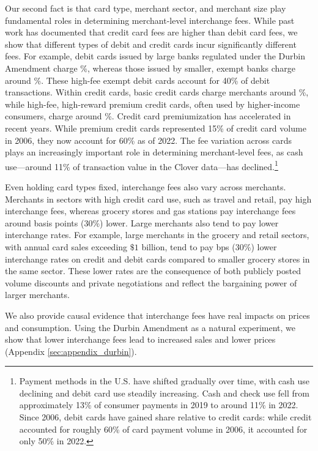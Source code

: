 \documentclass[main.tex]{subfiles}
\begin{document}
Our second fact is that card type, merchant sector, and merchant size play fundamental roles in determining merchant-level interchange fees.
While past work has documented that credit card fees are higher than debit card fees, we show that different types of debit and credit cards incur significantly different fees.
For example, debit cards issued by large banks regulated under the Durbin Amendment charge \%, whereas those issued by smaller, exempt banks charge around \%.
These high-fee exempt debit cards account for 40\% of debit transactions.
Within credit cards, basic credit cards charge merchants around \%, while high-fee, high-reward premium credit cards, often used by higher-income consumers, charge around \%.
Credit card premiumization has accelerated in recent years.
While premium credit cards represented 15\% of credit card volume in 2006, they now account for 60\% as of 2022.
The fee variation across cards plays an increasingly important role in determining merchant-level fees, as cash use---around 11\% of transaction value in the Clover data---has declined.\footnote{Payment methods in the U.S. have shifted gradually over time, with cash use declining and debit card use steadily increasing.
Cash and check use fell from approximately 13\% of consumer payments in 2019 to around 11\% in 2022.
Since 2006, debit cards have gained share relative to credit cards: while credit accounted for roughly 60\% of card payment volume in 2006, it accounted for only 50\% in 2022.}

Even holding card types fixed, interchange fees also vary across merchants.
Merchants in sectors with high credit card use, such as travel and retail, pay high interchange fees, whereas grocery stores and gas stations pay interchange fees around  basis points (30\%) lower.
Large merchants also tend to pay lower interchange rates.
For example, large merchants in the grocery and retail sectors, with annual card sales exceeding $\$1$ billion, tend to pay  bps (30\%) lower interchange rates on credit and debit cards compared to smaller grocery stores in the same sector.
These lower rates are the consequence of both publicly posted volume discounts and private negotiations and reflect the bargaining power of larger merchants.

We also provide causal evidence that interchange fees have real impacts on prices and consumption.
Using the Durbin Amendment as a natural experiment, we show that lower interchange fees lead to increased sales and lower prices (Appendix \ref{sec:appendix_durbin}).
\end{document}
